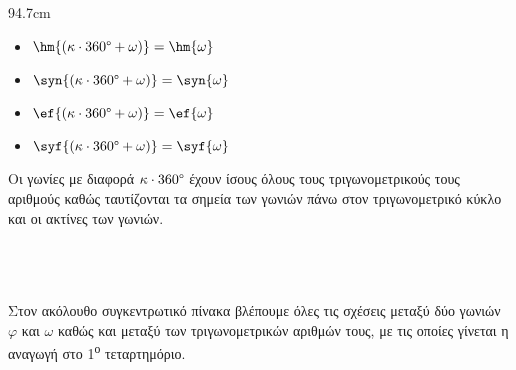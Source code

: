 \documentclass[twoside,11pt,a4paper,openany]{book}
\def\xrwma{black}
\newcommand{\tss}[1]{\textsuperscript{#1}}
\begin{document}
\begin{enumerate}[itemsep=0mm,label=\bf\arabic*.]
\begin{minipage}{\linewidth}
\begin{WrapText2}{9}{4.7cm}
\end{WrapText2}
\begin{multicols}{2}
\begin{itemize}[itemsep=0mm,leftmargin=4mm]
\item $ \hm{\left( \kappa\cdot360\degree+\omega\right)}=\hm{\omega} $
\item $ \syn{\left(
\kappa\cdot360\degree+\omega\right)}=\syn{\omega}$
\item $ \ef{\left( \kappa\cdot360\degree+\omega\right) }=\ef{\omega} $
\item $ \syf{\left( \kappa\cdot360\degree+\omega\right) }=\syf{\omega} $
\end{itemize}
\end{multicols}
Οι γωνίες με διαφορά $ \kappa\cdot360\degree $ έχουν ίσους όλους τους τριγωνομετρικούς τους αριθμούς καθώς ταυτίζονται τα σημεία των γωνιών πάνω στον τριγωνομετρικό κύκλο και οι ακτίνες των γωνιών.
\end{minipage}
\end{enumerate}\mbox{}\\\\\\
Στον ακόλουθο συγκεντρωτικό πίνακα βλέπουμε όλες τις σχέσεις μεταξύ δύο γωνιών $ \varphi $ και $ \omega $ καθώς και μεταξύ των τριγωνομετρικών αριθμών τους, με τις οποίες γίνεται η αναγωγή στο 1\tss{ο} τεταρτημόριο.
\end{document}
